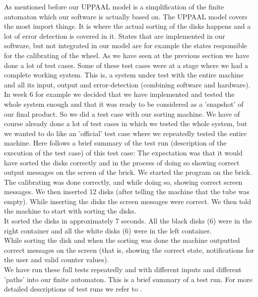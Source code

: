As mentioned before our UPPAAL model is a simplification of the finite automaton which our software is actually based on. The UPPAAL model covers the  most import things. It is where the actual sorting of the disks happens and a lot of error detection is covered in it. States that are implemented in our software, but not integrated in our model are for example the states responsible for the calibrating of the wheel. As we have seen at the previous section we have done a lot of test cases. Some of these test cases were at a stage where we had a complete working system. This is, a system under test with the entire machine and all its input, output and error-detection (combining software and hardware).\\

In week 6 for example we decided that we have implemented and tested the whole system enough and that it was ready to be considered as a 'snapshot' of our final product. So we did a test case with our sorting machine. We have of course already done a lot of test cases in which we tested the whole system, but we wanted to do like an 'official' test case where we repeatedly tested the entire machine. Here follows a brief summary of the test run (description of the execution of the test case) of this test case: The expectation was that it would have sorted the disks correctly and in the process of doing so showing correct output messages on the screen of the brick. We started the program on the brick. The calibrating was done correctly, and while doing so, showing correct screen messages. We then inserted 12 disks (after telling the machine that the tube was empty). While inserting the disks the screen messages were correct. We then told the machine to start with sorting the disks. 
\\It sorted the disks in approximately 7 seconds. All the black disks (6) were in the right container and all the white disks (6) were in the left container.\\ While sorting the disk and when the sorting was done the machine outputted correct messages on the screen (that is, showing the correct state, notifications for the user and valid counter values).\\
We have run these full tests repeatedly and with different inputs and different 'paths' into our finite automaton. This is a brief summary of a test run. For more detailed descriptions of test runs we refer to . 

